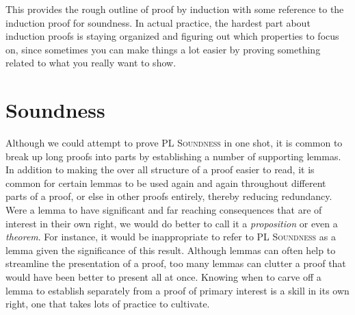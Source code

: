 This provides the rough outline of proof by induction with some reference to the induction proof for soundness.
In actual practice, the hardest part about induction proofs is staying organized and figuring out which properties to focus on, since sometimes you can make things a lot easier by proving something related to what you really want to show.







%   








\section{Soundness}%
  \label{sec:Soundness}

Although we could attempt to prove \textsc{PL Soundness} in one shot, it is common to break up long proofs into parts by establishing a number of supporting lemmas.
In addition to making the over all structure of a proof easier to read, it is common for certain lemmas to be used again and again throughout different parts of a proof, or else in other proofs entirely, thereby reducing redundancy.
Were a lemma to have significant and far reaching consequences that are of interest in their own right, we would do better to call it a \textit{proposition} or even a \textit{theorem}.
For instance, it would be inappropriate to refer to \textsc{PL Soundness} as a lemma given the significance of this result.
Although lemmas can often help to streamline the presentation of a proof, too many lemmas can clutter a proof that would have been better to present all at once.
Knowing when to carve off a lemma to establish separately from a proof of primary interest is a skill in its own right, one that takes lots of practice to cultivate.

